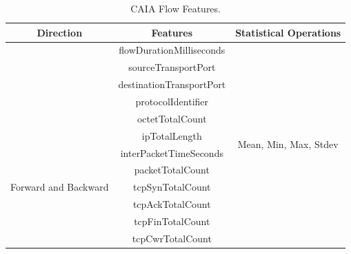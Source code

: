 \documentclass[conference]{IEEEtran}
\begin{document}
\begin{table}[ht!]
	
	\centering
	\caption{CAIA Flow Features.}
	\label{tab:cres}
	     
	\footnotesize
	\begin{tabular}{|c|c|c|}
		\toprule
		\textbf{Direction}                    & \textbf{Features}        & \textbf{Statistical Operations}        \\
		\midrule
		    
		                                      & flowDurationMilliseconds &                                        \\
		                                      & sourceTransportPort      &                                        \\
		                                      & destinationTransportPort &                                        \\
		                                      & protocolIdentifier       &                                        \\
		                                      & octetTotalCount          &                                        \\
		\midrule
		\multirow{7}{*}{Forward and Backward} & ipTotalLength            & \multirow{2}{*}{Mean, Min, Max, Stdev} \\
		                                      & interPacketTimeSeconds   &                                        \\
		\cmidrule{2-3}
		                                      & packetTotalCount         &                                        \\
		                                      & tcpSynTotalCount         &                                        \\
		                                      & tcpAckTotalCount         &                                        \\
		                                      & tcpFinTotalCount         &                                        \\
		                                      & tcpCwrTotalCount         &                                        \\
		   
		\midrule
		
		
	\end{tabular}
		
\end{table}
\end{document}
